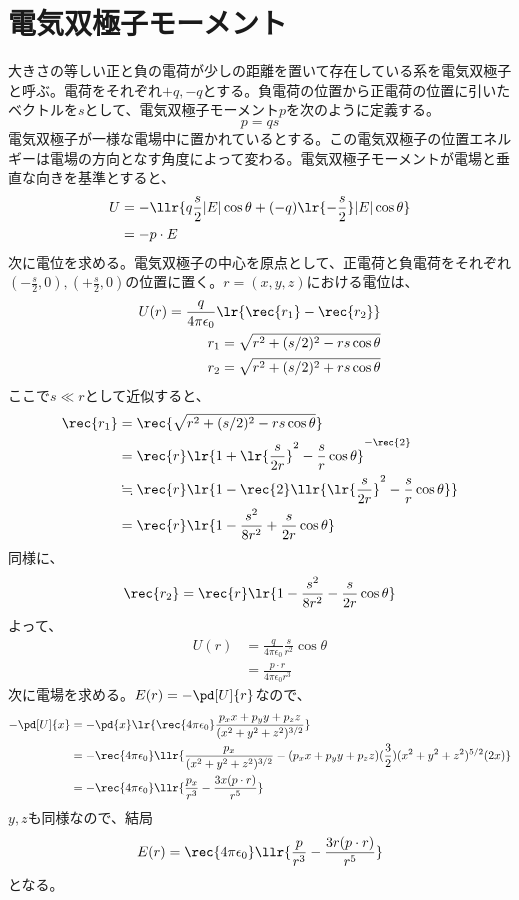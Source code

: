     \section{電気双極子モーメント}
        大きさの等しい正と負の電荷が少しの距離を置いて存在している系を電気双極子と呼ぶ。電荷をそれぞれ$+q,-q$とする。負電荷の位置から正電荷の位置に引いたベクトルを$s$として、電気双極子モーメント$p$を次のように定義する。
            \[p = qs\]
        電気双極子が一様な電場中に置かれているとする。この電気双極子の位置エネルギーは電場の方向となす角度によって変わる。電気双極子モーメントが電場と垂直な向きを基準とすると、
        \begin{align*}
            U &= -\llr{q\frac{s}{2}|E|\cos\theta +
            (-q)\lr{-\frac{s}{2}}|E|\cos\theta}\\
            &= -p\cdot E
        \end{align*}
        次に電位を求める。電気双極子の中心を原点として、正電荷と負電荷をそれぞれ$(-\frac{s}{2},0),(+\frac{s}{2},0)$の位置に置く。$r = (x,y,z)$における電位は、
        \begin{align*}
            U(r) = \frac{q}{4\pi\epsilon_0}\lr{\rec{r_1} - \rec{r_2}}\\
            r_1 = \sqrt{r^2 + (s/2)^2 - rs\cos\theta}\\
            r_2 = \sqrt{r^2 + (s/2)^2 + rs\cos\theta}
        \end{align*}
        ここで$s\ll r$として近似すると、
        \begin{align*}
            \rec{r_1} &= \rec{\sqrt{r^2 + (s/2)^2 - rs\cos\theta}}\\
            &= \rec{r}\lr{1 + \lr{\frac{s}{2r}}^2
                - \frac{s}{r}\cos\theta}^{-\rec{2}}\\
            &\fallingdotseq \rec{r}\lr{1 - \rec{2}
                \llr{\lr{\frac{s}{2r}}^2 - \frac{s}{r}\cos\theta}}\\
            &= \rec{r}\lr{1 - \frac{s^2}{8r^2} + \frac{s}{2r}\cos\theta}
        \end{align*}
        同様に、
            \[\rec{r_2} =\rec{r}
            \lr{1 - \frac{s^2}{8r^2} - \frac{s}{2r}\cos\theta}\]
        よって、
        \begin{align*}
            U(r) &= \frac{q}{4\pi\epsilon_0}\frac{s}{r^2}\cos\theta\\
            &= \frac{p\cdot r}{4\pi\epsilon_0r^3}
        \end{align*}
        次に電場を求める。$E(r) = -\pd[U]{r}$なので、
        \begin{align*}
            -\pd[U]{x} &= -\pd{x}\lr{\rec{4\pi\epsilon_0}\frac{p_x x + p_y y + p_z z}{(x^2+y^2+z^2)^{3/2}}}\\
            &= -\rec{4\pi\epsilon_0}\llr{\frac{p_x}{(x^2 + y^2 + z^2)^{3/2}} - (p_x x + p_y y + p_z z)(\frac{3}{2})(x^2 + y^2 + z^2)^{5/2}(2x)}\\
            &= -\rec{4\pi\epsilon_0}\llr{\frac{p_x}{r^3} - \frac{3x(p\cdot r)}{r^5}}
        \end{align*}
        $y,z$も同様なので、結局
            \[E(r) = \rec{4\pi\epsilon_0}\llr{\frac{p}{r^3} - \frac{3r(p\cdot r)}{r^5}}\]
        となる。
